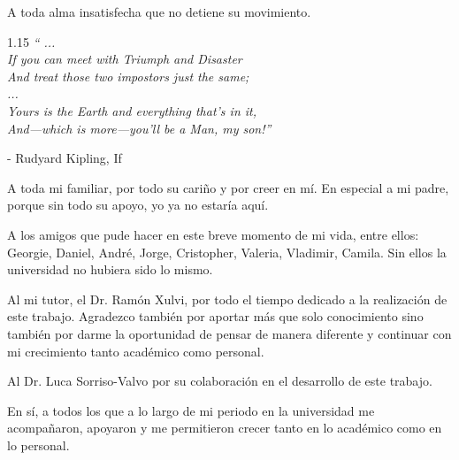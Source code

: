     \begin{dedicatoria}
    A toda alma insatisfecha que no detiene su movimiento.

\begin{flushright}
    \begin{spacing}{1.15}
        \textit{`` \hspace*{4cm} ... \hspace*{4cm} \\
                If you can meet with Triumph and Disaster\\
                And treat those two impostors just the same;\\
                \hspace*{4cm} ... \hspace*{4cm} \\
                Yours is the Earth and everything that’s in it,\\
            And—which is more—you’ll be a Man, my son!''
        }
    \end{spacing}
    - Rudyard Kipling, If    
\end{flushright}
    \end{dedicatoria}
    \begin{agradecimiento}
        A toda mi familiar, por todo su cariño y por creer en mí. En especial a mi padre, porque sin todo su apoyo, yo ya no estaría aquí.

        A los amigos que pude hacer en este breve momento de mi vida, entre ellos: Georgie, Daniel, André, Jorge, Cristopher, Valeria, Vladimir, Camila. Sin ellos la universidad no hubiera sido lo mismo. 
        
        Al mi tutor, el Dr. Ramón Xulvi, por todo el tiempo dedicado a la realización de este trabajo. Agradezco también por aportar más que solo conocimiento sino también por darme la oportunidad de pensar de manera diferente y continuar con mi crecimiento tanto académico como personal.  
        
        Al Dr. Luca Sorriso-Valvo por su colaboración en el desarrollo de este trabajo.  
        
        En sí, a todos los que a lo largo de mi periodo en la universidad me acompañaron, apoyaron y me permitieron crecer tanto en lo académico como en lo personal.
        
    \end{agradecimiento}